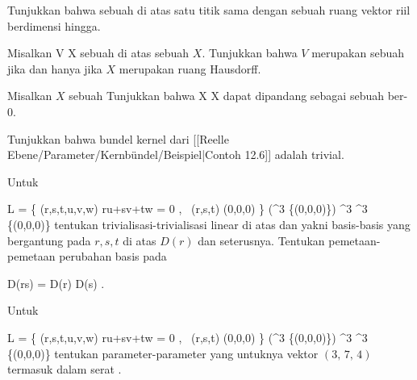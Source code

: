 \setcounter{section}{12}

{}
{

Tunjukkan bahwa sebuah
di atas satu titik
 {} {}
sama dengan sebuah ruang vektor riil berdimensi hingga.

}
{} {}

{}
{

Misalkan
 { V } { X
} {}
sebuah
di atas sebuah
$X$. Tunjukkan bahwa $V$ merupakan sebuah
jika dan hanya jika $X$ merupakan ruang Hausdorff.

}
{} {}

{}
{

Misalkan $X$ sebuah
Tunjukkan bahwa
 { X } { X
} {}
dapat dipandang sebagai sebuah
ber-
$0$.

}
{} {}

{}
{

Tunjukkan bahwa bundel kernel dari
[[Reelle Ebene/Parameter/Kernbündel/Beispiel|Contoh 12.6]]
adalah trivial.

}
{} {}

{}
{

Untuk

\mavergleichskettealign
{\vergleichskettealign
{L
}
{ =} { \left\{ (r,s,t,u,v,w)  \mid  ru+sv+tw = 0 , \, (r,s,t) \neq (0,0,0)       \right\}
}
{ \subseteq} { (\R^3 \setminus \{(0,0,0)\}) \times \R^3
}
{ \longrightarrow} { \R^3 \setminus \{(0,0,0)\}
}
{ } {
}
}
{}{}{}
tentukan trivialisasi-trivialisasi linear di atas
 dan
 yakni basis-basis yang bergantung pada $r,s,t$ di atas $D(r)$ dan seterusnya. Tentukan pemetaan-pemetaan perubahan basis pada

\mavergleichskette
{\vergleichskette
{D(rs)
}
{ = }{ D(r) \cap D(s)
}
{  }{
}
{    }{
}
{   }{
}
}
{}{}{.}

}
{} {}

{}
{

Untuk

\mavergleichskettealign
{\vergleichskettealign
{L
}
{ =} { \left\{ (r,s,t,u,v,w)  \mid  ru+sv+tw = 0 , \, (r,s,t) \neq (0,0,0)       \right\}
}
{ \subseteq} { (\R^3 \setminus \{(0,0,0)\}) \times \R^3
}
{ \longrightarrow} { \R^3 \setminus \{(0,0,0)\}
}
{ } {
}
}
{}{}{}
tentukan parameter-parameter
 yang untuknya vektor $\left(  3   , \,   7  , \,   4                 \right)$ termasuk dalam serat
.

}
{} {}

